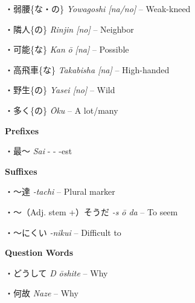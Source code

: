\par{・弱腰\{な・の\} \emph{Yowagoshi [na\slash no] }– Weak-kneed }

\par{・隣人\{の\} \emph{Rinjin [no] }– Neighbor }

\par{・可能\{な\} \emph{Kan }\emph{ō [na] }– Possible }

\par{・高飛車\{な\} \emph{Takabisha [na] }– High-handed }

\par{・野生\{の\} \emph{Yasei [no] }– Wild }

\par{・多く\{の\} \emph{Ōku }– A lot\slash many }

\par{\textbf{Prefixes }}

\par{・最～ \emph{Sai }- - -est }

\par{\textbf{Suffixes }}

\par{・～達 \emph{-tachi }– Plural marker }

\par{・～（Adj. stem +）そうだ \emph{-s }\emph{ō da }– To seem }

\par{・～にくい \emph{-nikui }– Difficult to }

\par{\textbf{Question Words }}

\par{・どうして \emph{D }\emph{ōshite }– Why }

\par{・何故 \emph{Naze }– Why }
      

